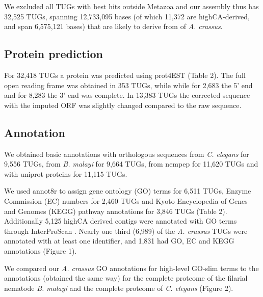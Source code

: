 \documentclass[10pt]{bmc_article}
\newenvironment{bmcformat}{\begin{raggedright}\baselineskip20pt\sloppy\setboolean{publ}{false}}{\end{raggedright}\baselineskip20pt\sloppy}
\begin{document}
\begin{bmcformat}
We excluded all TUGs with best hits outside Metazoa and our assembly
thus has 32,525 TUGs, spanning
12,733,095
bases (of which 11,372 are
highCA-derived, and span
6,575,121
bases) that are likely to derive from of \textit{A. crassus}.

\subsection*{Protein prediction}
















For
32,418
TUGs a protein was predicted using prot4EST
\cite{wasmuth_prot4est:_2004} (Table 2). The full open reading frame
was obtained in
353 TUGs,
while while for
2,683 the 5’ end
and for 8,283 the
3' end was complete. In 13,383 TUGs the
corrected sequence with the imputed ORF was slightly changed compared
to the raw sequence.

\subsection*{Annotation}

We obtained basic annotations with orthologous sequences from
\textit{C. elegans} for
9,556
TUGs, from \textit{B. malayi} for
9,664
TUGs, from nempep \cite{parkinson_nembase:resource_2004, pmid21550347}
for
11,620
TUGs and with uniprot proteins for
11,115
TUGs.

We used annot8r \cite{schmid_annot8r:_2008} to assign gene ontology
(GO) terms for 6,511 TUGs, Enzyme Commission (EC) numbers
for 2,460 TUGs and Kyoto Encyclopedia of Genes and Genomes
(KEGG) pathway annotations for 3,846 TUGs (Table
2). Additionally 5,125 highCA derived contigs were
annotated with GO terms through InterProScan
\cite{pmid11590104}. Nearly one third (6,989) of
the \textit{A. crassus} TUGs were annotated with at least one
identifier, and 1,831 had GO, EC and KEGG
annotations (Figure 1).

We compared our \textit{A. crassus} GO annotations for high-level
GO-slim terms to the annotations (obtained the same way) for the
complete proteome of the filarial nematode \textit{B. malayi} and the
complete proteome of \textit{C. elegans} (Figure 2).


\end{bmcformat}
\end{document}
